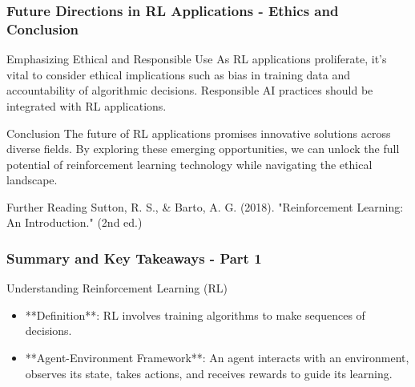 \documentclass[aspectratio=169]{beamer}
\begin{document}
\begin{frame}[fragile]
  \frametitle{Future Directions in RL Applications - Ethics and Conclusion}
  
  \begin{block}{Emphasizing Ethical and Responsible Use}
    As RL applications proliferate, it’s vital to consider ethical implications such as bias in training data and accountability of algorithmic decisions. Responsible AI practices should be integrated with RL applications.
  \end{block}
  
  \begin{block}{Conclusion}
    The future of RL applications promises innovative solutions across diverse fields. By exploring these emerging opportunities, we can unlock the full potential of reinforcement learning technology while navigating the ethical landscape.
  \end{block}
  
  \begin{block}{Further Reading}
    Sutton, R. S., \& Barto, A. G. (2018). "Reinforcement Learning: An Introduction." (2nd ed.)
  \end{block}
\end{frame}

\begin{frame}[fragile]
  \frametitle{Summary and Key Takeaways - Part 1}
  
  \begin{block}{Understanding Reinforcement Learning (RL)}
    \begin{itemize}
      \item **Definition**: RL involves training algorithms to make sequences of decisions.
      \item **Agent-Environment Framework**: An agent interacts with an environment, observes its state, takes actions, and receives rewards to guide its learning.
    \end{itemize}
  \end{block}
  
\end{frame}
\end{document}
